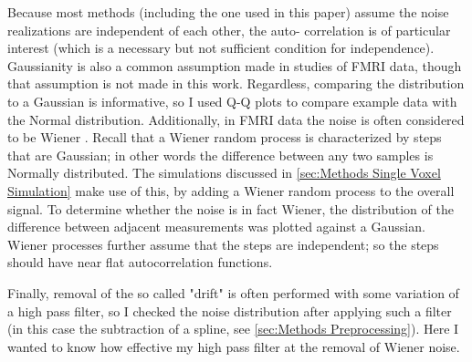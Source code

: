 Because most methods (including the one used in this paper)
assume the noise realizations are independent of each other, the auto-
correlation is of particular interest (which is a necessary but not
sufficient condition for independence). Gaussianity is also a common
assumption made in studies of FMRI data, though that assumption is not
made in this work. Regardless, comparing the distribution to a Gaussian
is informative, so I used Q-Q plots to compare example data with the
Normal distribution. Additionally, in FMRI data the noise is often considered 
to be Wiener \cite{Riera2003}. Recall that a Wiener random process is
characterized by steps that are Gaussian; in other words the difference between
any two samples is Normally distributed. The simulations discussed in 
\autoref{sec:Methods Single Voxel Simulation} make use of this, 
by adding a Wiener random process to the overall signal. To determine
whether the noise is in fact Wiener, the distribution of 
the difference between adjacent measurements was plotted against
a Gaussian. Wiener processes further assume that the steps are independent;
so the steps should have near flat autocorrelation functions.

Finally, removal of the so called "drift" is often
performed with some variation of a high pass filter, 
so I checked the noise distribution after applying such a filter (in
this case the subtraction of a spline, see \autoref{sec:Methods Preprocessing}).
Here I wanted to know how effective my high pass filter at the removal of
Wiener noise.

